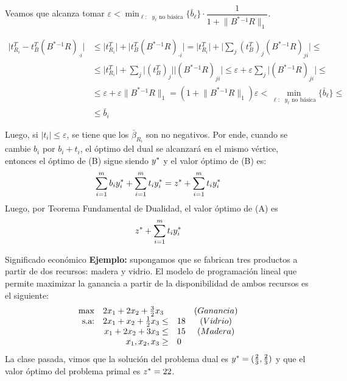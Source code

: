 \documentclass[10pt, aspectratio=169]{beamer}
\begin{document}
\begin{frame}{}
    \vspace{1em}
    \fontsize{9pt}{2pt}\selectfont
    Veamos que alcanza tomar $\varepsilon < \displaystyle\min_{\ell: \text{ $y_\ell$ no básica}}\{\bar{b}_\ell \}\cdot \dfrac{1}{1 + \lVert B^{\ast}{}^{-1}R \rVert _1}$. 
    
    \begin{align*}
        \lvert t_{R_i}^T - t_B^T(B^{\ast}{}^{-1}R)_{\cdot i} \rvert & \leq \lvert t_{R_i}^T \rvert + \lvert t_B^T(B^{\ast}{}^{-1}R)_{\cdot i} \rvert = \lvert t_{R_i}^T \rvert + \lvert \displaystyle\sum_j \left(t_{B}^T\right)_j(B^{\ast}{}^{-1}R)_{j i} \rvert \leq \\
        & \leq \lvert t_{R_i}^T \rvert + \displaystyle\sum_j \lvert\left(t_{B}^T\right)_j\rvert\lvert (B^{\ast}{}^{-1}R)_{j i} \rvert \leq \varepsilon + \varepsilon \displaystyle\sum_j \lvert (B^{\ast}{}^{-1}R)_{j i} \rvert \leq \\
        & \leq \varepsilon + \varepsilon \lVert B^{\ast}{}^{-1}R \rVert _1 = (1 + \lVert B^{\ast}{}^{-1}R \rVert _1) \varepsilon < \displaystyle\min_{\ell: \text{ $y_\ell$ no básica}}\{\bar{b}_\ell \} \leq \\
        & \leq \bar{b}_i
    \end{align*}

    Luego, si $\lvert t_i \rvert \leq\varepsilon$, se tiene que los $\bar{\beta}_{R_i}$ son no negativos. Por ende, cuando se cambie $b_i$ por $b_i+t_i$, el óptimo del dual se alcanzará en el mismo vértice, entonces el óptimo de (B) sigue siendo $y^{\ast}$ y el valor óptimo de (B) es:
    \[ \displaystyle \sum_{i=1}^m b_iy^{\ast}_i + \sum_{i=1}^m t_iy^{\ast}_i = z^{\ast} + \sum_{i=1}^m t_iy^{\ast}_i \]
    Luego, por Teorema Fundamental de Dualidad, el valor óptimo de (A) es 
    \[z^{\ast}+ \sum_{i=1}^m t_iy^{\ast}_i\]
\end{frame}

\begin{frame}{Significado económico}
    \textbf{Ejemplo:} supongamos que se fabrican tres productos a partir de dos recursos: madera y vidrio. El modelo de programación lineal que permite maximizar la ganancia a partir de la disponibilidad de ambos recursos es el siguiente:
    $$
    \begin{array}{rrlc}
    \max & \multicolumn{2}{l}{2x_1+2x_2+\frac{3}{2}x_3} & (Ganancia)\\
    \text{s.a:}& 2x_1+x_2+\frac{1}{2}x_3\leq & 18 & (Vidrio)\\
     & x_1+2x_2+3x_3\leq & 15 & (Madera)\\
     & x_1, x_2, x_3\geq & 0 \\
    \end{array}
    $$
    La clase pasada, vimos que la solución del problema dual es $y^{\ast}=(\frac{2}{3}, \frac{2}{3})$ y que el valor óptimo del problema primal es $z^{\ast}=22$.
\end{frame}
\end{document}
